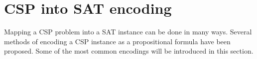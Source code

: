 \section{CSP into SAT encoding}\label{sec:csp_to_sat}
Mapping a CSP problem into a SAT instance can be done in many ways. Several methods of encoding a CSP instance as a propositional formula have been proposed. Some of the most common encodings will be introduced in this section.








